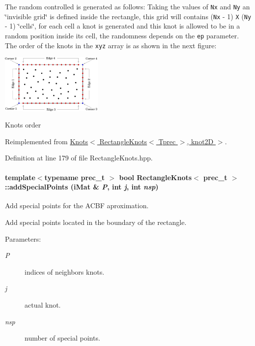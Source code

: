 The random controlled is generated as follows: Taking the values of {\tt Nx} and {\tt Ny} an \char`\"{}invisible grid\char`\"{} is defined inside the rectangle, this grid will contains ({\tt Nx} - 1) {\tt X} ({\tt Ny} - 1) \char`\"{}cells\char`\"{}, for each cell a knot is generated and this knot is allowed to be in a random position inside its cell, the randomness depends on the {\tt ep} parameter. The order of the knots in the {\tt xyz} array is as shown in the next figure:  \begin{Image}
\begin{center}
\includegraphics[width=5cm]{RectangleKnots}\caption{Knots order}
\end{center}
\end{Image}
 

Reimplemented from \hyperlink{classKnots_8e622932aee837d4c3465093f3158ebb}{Knots$<$ RectangleKnots$<$ Tprec $>$, knot2D $>$}.

Definition at line 179 of file RectangleKnots.hpp.\hypertarget{classRectangleKnots_79604c78432ea23cfb28fc09d612f48c}{
\paragraph[{addSpecialPoints}]{\setlength{\rightskip}{0pt plus 5cm}template$<$typename prec\_\-t $>$ bool {\bf RectangleKnots}$<$ prec\_\-t $>$::addSpecialPoints ({\bf iMat} \& {\em P}, \/  int {\em j}, \/  int {\em nsp})}\hfill}
\label{classRectangleKnots_79604c78432ea23cfb28fc09d612f48c}


Add special points for the ACBF aproximation. 

Add special points located in the boundary of the rectangle.

\begin{Desc}
\item[Parameters:]
\begin{description}
\item[{\em P}]indices of neighbors knots. \item[{\em j}]actual knot. \item[{\em nsp}]number of special points. \end{description}
\end{Desc}


